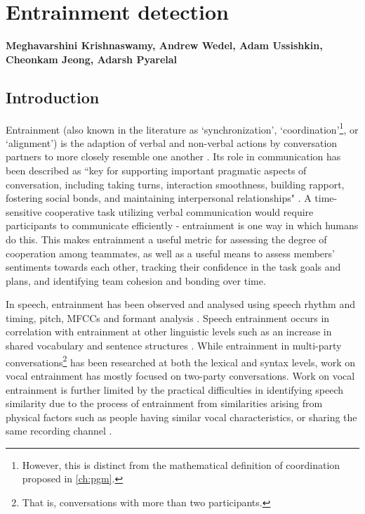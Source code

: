 \chapter{Entrainment detection}
\label{ch:entrainment}

\textbf{Meghavarshini Krishnaswamy, Andrew Wedel, Adam Ussishkin, Cheonkam
Jeong, Adarsh Pyarelal} 

\section{Introduction}

Entrainment (also known in the literature as `synchronization',
`coordination'\footnote{However, this is distinct from the mathematical
definition of coordination proposed in \autoref{ch:pgm}.}, or `alignment') is
the adaption of verbal and non-verbal actions by conversation partners to more
closely resemble one another \citep{borrie2014}. Its role in communication has
been described as ``key for supporting important pragmatic aspects of
conversation, including taking turns, interaction smoothness, building rapport,
fostering social bonds, and maintaining interpersonal relationships"
\citep{borrie2019}.  A time-sensitive cooperative task utilizing verbal
communication would require participants to communicate efficiently -
entrainment is one way in which humans do this. This makes entrainment a useful
metric for assessing the degree of cooperation among teammates, as well as a
useful means to assess members' sentiments towards each other, tracking their
confidence in the task goals and plans, and identifying team cohesion and
bonding over time.

In speech, entrainment has been observed and analysed using speech rhythm and
timing, pitch, MFCCs and formant analysis
\citep{reichel2018prosodic,borrie2019syncing}. Speech entrainment occurs in
correlation with entrainment at other linguistic levels such as an increase in
shared vocabulary and sentence structures \citep{rahimi2017entrainment}.  While
entrainment in multi-party conversations\footnote{That is, conversations with
more than two participants.} has been researched at both the lexical and syntax
levels, work on vocal entrainment has mostly focused on two-party
conversations. Work on vocal entrainment is further limited by the practical
difficulties in identifying speech similarity due to the process of entrainment
from similarities arising from physical factors such as people having similar
vocal characteristics, or sharing the same recording channel \citep{nasir2020}.


